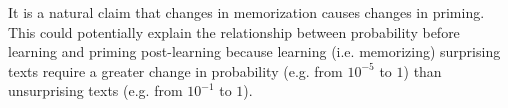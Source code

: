\documentclass[11pt, a4paper, logo, copyright]{googledeepmind}
\theoremstyle{plain}
\theoremstyle{definition}
\theoremstyle{remark}
\begin{document}

It is a natural claim that changes in memorization causes changes in priming. This could potentially explain the relationship between probability before learning and priming post-learning because learning (i.e. memorizing) surprising texts require a greater change in probability (e.g. from $10^{-5}$ to $1$) than unsurprising texts (e.g. from $10^{-1}$ to $1$). 

\end{document}
